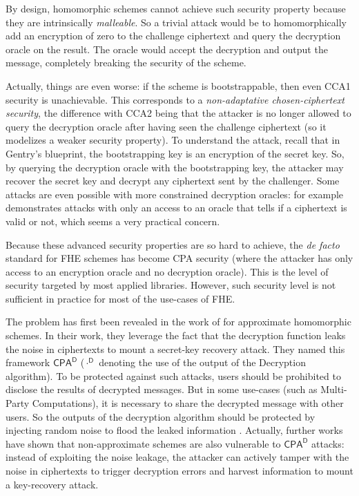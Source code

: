 By design, homomorphic schemes cannot achieve such security property because they are intrinsically \textit{malleable}. So a trivial attack would be to homomorphically add an encryption of zero to the challenge ciphertext and query the decryption oracle on the result. The oracle would accept the decryption and output the message, completely breaking the security of the scheme.

Actually, things are even worse: if the scheme is bootstrappable, then even \textsf{CCA1} security is unachievable. This corresponds to a \textit{non-adaptative chosen-ciphertext security}, the difference with \textsf{CCA2} being that the attacker is no longer allowed to query the decryption oracle after having seen the challenge ciphertext (so it modelizes a weaker security property). To understand the attack, recall that in Gentry's blueprint, the bootstrapping key is an encryption of the secret key. So, by querying the decryption oracle with the bootstrapping key, the attacker may recover the secret key and decrypt any ciphertext sent by the challenger. Some attacks are even possible with more constrained decryption oracles: for example \cite{SAC:LMSV11} demonstrates attacks with only an access to an oracle that tells if a ciphertext is valid or not, which seems a very practical concern.


Because these advanced security properties are so hard to achieve, the \textit{de facto} standard for FHE schemes has become \textsf{CPA} security (where the attacker has only access to an encryption oracle and no decryption oracle). This is the level of security targeted by most applied libraries. However, such security level is not sufficient in practice for most of the use-cases of FHE.


The problem has first been revealed in the work of \cite{EC:LiMic21} for approximate homomorphic schemes. In their work, they leverage the fact that the decryption function leaks the noise in ciphertexts to mount a secret-key recovery attack. They named this framework $\textsf{CPA}^\textsf{D}$ ($\cdot ^ \textsf{D}$ denoting the use of the output of the Decryption algorithm). To be protected against such attacks, users should be prohibited to disclose the results of decrypted messages. But in some use-cases (such as Multi-Party Computations), it is necessary to share the decrypted message with other users. So the outputs of the decryption algorithm should be protected by injecting random noise to flood the leaked information \cite{EPRINT:CheHonKim20}. Actually, further works \cite{C:CSBB24, CCS:CCPSS24} have shown that non-approximate schemes are also vulnerable to $\textsf{CPA}^\textsf{D}$ attacks: instead of exploiting the noise leakage, the attacker can actively tamper with the noise in ciphertexts to trigger decryption errors and harvest information to mount a key-recovery attack.


